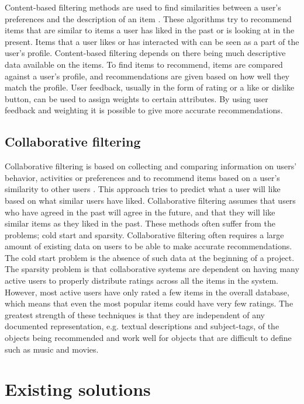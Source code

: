 Content-based filtering methods are used to find similarities between a user's preferences and the description of an item \cite{HM5}. These algorithms try to recommend items that are similar to items a user has liked in the past or is looking at in the present. Items that a user likes or has interacted with can be seen as a part of the user's profile. Content-based filtering depends on there being much descriptive data available on the items. To find items to recommend, items are compared against a user's profile, and recommendations are given based on how well they match the profile. User feedback, usually in the form of rating or a like or dislike button, can be used to assign weights to certain attributes. By using user feedback and weighting it is possible to give more accurate recommendations. \cite{HM4}

\subsection{Collaborative filtering}

Collaborative filtering is based on collecting and comparing information on users' behavior, activities or preferences and to recommend items based on a user's similarity to other users \cite{HM6}. This approach tries to predict what a user will like based on what similar users have liked. Collaborative filtering assumes that users who have agreed in the past will agree in the future, and that they will like similar items as they liked in the past. These methods often suffer from the problems; cold start and sparsity. Collaborative filtering often requires a large amount of existing data on users to be able to make accurate recommendations. The cold start problem is the absence of such data at the beginning of a project. The sparsity problem is that collaborative systems are dependent on having many active users to properly distribute ratings across all the items in the system. However, most active users have only rated a few items in the overall database, which means that even the most popular items could have very few ratings. The greatest strength of these techniques is that they are independent of any documented representation, e.g. textual descriptions and subject-tags, of the objects being recommended and work well for objects that are difficult to define such as music and movies.\cite{HM4}

\section{Existing solutions}
\label{sec:existing_solutions}

